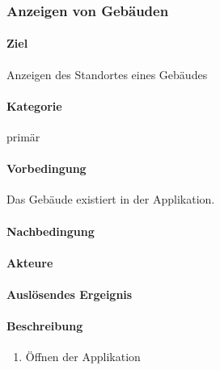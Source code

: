 \subsubsection{Anzeigen von Gebäuden}
\label{Anzeigen von Gebäuden}
\paragraph{Ziel}
Anzeigen des Standortes eines Gebäudes
\paragraph{Kategorie}
primär
\paragraph{Vorbedingung}
Das Gebäude existiert in der Applikation.
\paragraph{Nachbedingung}

\paragraph{Akteure}

\paragraph{Auslösendes Ergeignis}

\paragraph{Beschreibung}
\begin{enumerate}
    \item Öffnen der Applikation
\end{enumerate}